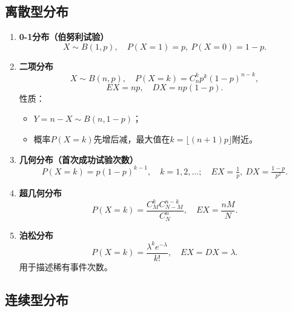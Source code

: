 \subsection{离散型分布}
\begin{enumerate}
      \item \textbf{0-1分布（伯努利试验）}
            \[
                  X\sim B(1,p),\quad P(X=1)=p,\ P(X=0)=1-p.
            \]

      \item \textbf{二项分布}
            \[
                  X\sim B(n,p),\quad P(X=k)=C_n^k p^k(1-p)^{n-k},
            \]
            \[
                  E X = np,\quad D X = np(1-p).
            \]
            性质：
            \begin{itemize}
                  \item $Y=n-X\sim B(n,1-p)$；
                  \item 概率$P(X=k)$先增后减，最大值在$k=\lfloor (n+1)p\rfloor$附近。
            \end{itemize}

      \item \textbf{几何分布（首次成功试验次数）}
            \[
                  P(X=k)=p(1-p)^{k-1},\quad k=1,2,\dots;\quad E X=\tfrac{1}{p},\ D X=\tfrac{1-p}{p^2}.
            \]

      \item \textbf{超几何分布}
            \[
                  P(X=k)=\frac{C_M^kC_{N-M}^{n-k}}{C_N^n},\quad E X=\frac{nM}{N}.
            \]

      \item \textbf{泊松分布}
            \[
                  P(X=k)=\frac{\lambda^k e^{-\lambda}}{k!},\quad E X = D X = \lambda.
            \]
            用于描述稀有事件次数。
\end{enumerate}


\subsection{连续型分布}

